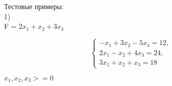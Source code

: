 \documentclass{article}
\begin{document}
	Тестовые примеры:\\
	1)\\
	F = $2x_1 + x_2 + 3x_3$
	
	\begin{equation*}
	\begin{cases}
		-x_1 + 3x_2 - 5x_3 = 12,
		\\
		2x_1 - x_2 + 4x_3 = 24,
		\\
		3x_1 + x_2 + x_3 = 18
	\end{cases}
	\end{equation*}
	
	$x_1, x_2, x_3 >= 0$
	\\
	
\end{document}
